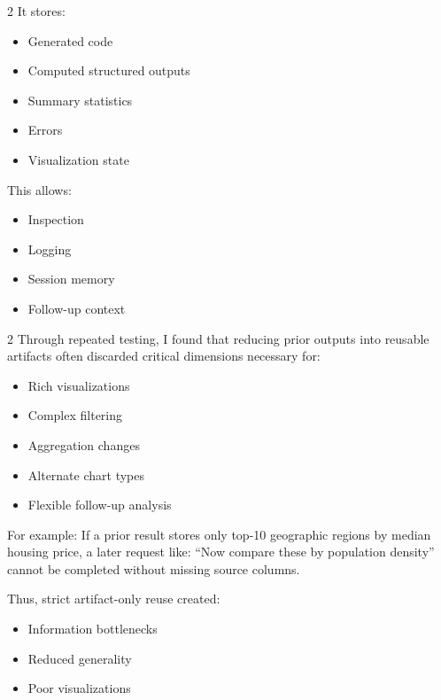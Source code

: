 \documentclass[12pt, oneside]{report}
\begin{document}
\begin{multicols}{2}
    It stores:

    \begin{itemize}
        \item Generated code
        \item Computed structured outputs
        \item Summary statistics
        \item Errors
        \item Visualization state
    \end{itemize}

    \vspace*{\fill}\columnbreak

    This allows:

    \begin{itemize}
        \item Inspection
        \item Logging
        \item Session memory
        \item Follow-up context
    \end{itemize}

    \vspace*{\fill}
\end{multicols}

\begin{multicols}{2}
Through repeated testing, I found that reducing prior outputs into reusable artifacts often discarded critical dimensions necessary for:

\begin{itemize}
    \item Rich visualizations
    \item Complex filtering
    \item Aggregation changes
    \item Alternate chart types
    \item Flexible follow-up analysis
\end{itemize}

\vspace*{\fill}\columnbreak

For example: If a prior result stores only top-10 geographic regions by median housing price, a later request like: ``Now compare these by population density'' cannot be completed without missing source columns.

Thus, strict artifact-only reuse created:

\begin{itemize}
    \item Information bottlenecks
    \item Reduced generality
    \item Poor visualizations
\end{itemize}

\vspace*{\fill}
\end{multicols}
\end{document}

